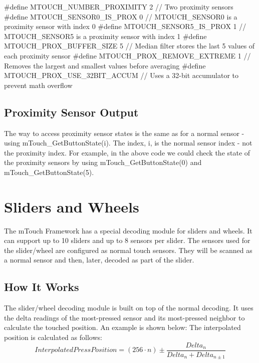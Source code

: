 \begin{DoxyCode}
\textcolor{preprocessor}{#define MTOUCH\_NUMBER\_PROXIMITY       2   // Two proximity sensors}
\textcolor{preprocessor}{#define MTOUCH\_SENSOR0\_IS\_PROX        0   // MTOUCH\_SENSOR0 is a proximity sensor with index 0}
\textcolor{preprocessor}{#define MTOUCH\_SENSOR5\_IS\_PROX        1   // MTOUCH\_SENSOR5 is a proximity sensor with index 1}
\textcolor{preprocessor}{#define MTOUCH\_PROX\_BUFFER\_SIZE       5   // Median filter stores the last 5 values of each proximity
       sensor}
\textcolor{preprocessor}{#define MTOUCH\_PROX\_REMOVE\_EXTREME    1   // Removes the largest and smallest values before averaging}
\textcolor{preprocessor}{#define MTOUCH\_PROX\_USE\_32BIT\_ACCUM       // Uses a 32-bit accumulator to prevent math overflow}
\end{DoxyCode}
\hypertarget{feat_proximity_featProx-Out}{}\subsection{Proximity Sensor Output}\label{feat_proximity_featProx-Out}
The way to access proximity sensor states is the same as for a normal sensor -\/ using m\+Touch\+\_\+\+Get\+Button\+State(i). The index, i, is the normal sensor index -\/ not the proximity index. For example, in the above code we could check the state of the proximity sensors by using m\+Touch\+\_\+\+Get\+Button\+State(0) and m\+Touch\+\_\+\+Get\+Button\+State(5). \hypertarget{featSliders}{}\section{Sliders and Wheels}\label{featSliders}
The m\+Touch Framework has a special decoding module for sliders and wheels. It can support up to 10 sliders and up to 8 sensors per slider. The sensors used for the slider/wheel are configured as normal touch sensors. They will be scanned as a normal sensor and then, later, decoded as part of the slider.\hypertarget{feat_sliders_featSlider-How}{}\subsection{How It Works}\label{feat_sliders_featSlider-How}
The slider/wheel decoding module is built on top of the normal decoding. It uses the delta readings of the most-\/pressed sensor and it\textquotesingle{}s most-\/pressed neighbor to calculate the touched position. An example is shown below\+: The interpolated position is calculated as follows\+: \[ Interpolated Press Position = (256 \cdot n) \pm \frac{Delta_{n}}{Delta_{n} + Delta_{n \pm 1}} \]

